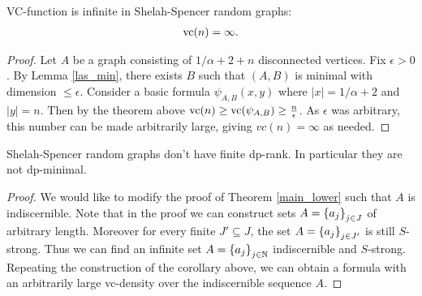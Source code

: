 \documentclass{amsart}
\begin{document}
\begin{Corollary}
  VC-function is infinite in Shelah-Spencer random graphs:
  \begin{align*}
    \operatorname{vc}(n) = \infty.
  \end{align*}
\end{Corollary}

\begin{proof}
  Let $A$ be a graph consisting of $1/\alpha + 2 + n$ disconnected vertices.
  Fix $\epsilon > 0$.
  By Lemma \ref{las_min}, there exists $B$ such that $(A, B)$ is minimal with dimension $\leq \epsilon$.
  Consider a basic formula $\psi_{A, B}(x, y)$ where $|x| = 1/\alpha + 2$ and $|y| = n$.
  Then by the theorem above $\operatorname{vc}(n) \geq \operatorname{vc} (\psi_{A,B}) \geq \frac{n}{\epsilon}$.
  As $\epsilon$ was arbitrary, this number can be made arbitrarily large, giving $vc(n) = \infty$ as needed.
\end{proof}

\begin{Corollary}
  Shelah-Spencer random graphs don't have finite dp-rank.
  In particular they are not dp-minimal.
\end{Corollary}

\begin{proof}
  We would like to modify the proof of Theorem \ref{main_lower} such that $A$ is indiscernible.
  Note that in the proof we can construct sets $A = \left\{a_j\right\}_{j \in J}$ of arbitrary length.
  Moreover for every finite $J' \subseteq J$, the set $A = \left\{a_j\right\}_{j \in J'}$ is still $S$-strong.
  Thus we can find an infinite set $A = \left\{a_j\right\}_{j \in \mathbb{N}}$ indiscernible and $S$-strong.
  Repeating the construction of the corollary above,
  we can obtain a formula with an arbitrarily large vc-density over the indiscernible sequence $A$.
\end{proof}



\end{document}
